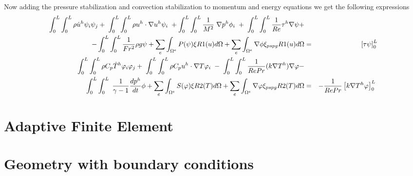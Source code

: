 \bigskip
\noindent Now adding the pressure stabilization and convection stabilization to momentum and energy equations we get the following expressions
\begin{eqnarray*}
\int_{0}^{L} \int_{0}^{L}\rho \dot{u}^h \psi_i \psi_j + \hspace{1mm}\int_{0}^{L} \int_{0}^{L} \rho u^h \cdot \nabla u^h \psi_i \hspace{1mm}  + \int_{0}^{L} \int_{0}^{L}  \frac{1}{M^2}\hspace{1mm}\nabla p^h \phi_i \hspace{1mm} + \hspace{1mm}\int_{0}^{L} \int_{0}^{L}\frac{1}{Re} \tau^h \nabla \psi +  \\ - \int_{0}^{L} \int_{0}^{L}\frac{1}{Fr^2}\rho g \psi + \sum_e \int_{\Omega^e} P(\psi) \xi R1(u)  d\Omega + \sum_e \int_{\Omega^e} \nabla \phi \xi_{pspg} R1(u)  d\Omega  &=& \left[\tau \psi \right]_0^L \\
\int_{0}^{L} \int_{0}^{L} \rho C_p \dot{T}^h \varphi_i \varphi_j + \hspace{1mm}\int_{0}^{L} \int_{0}^{L} \rho C_p u^h \cdot \nabla T \varphi_i \hspace{1mm} - \hspace{1mm} \int_{0}^{L} \int_{0}^{L} \frac{1}{Re Pr}(k \nabla T^h) \nabla \varphi - \\ \int_{0}^{L} \int_{0}^{L} \hspace{1mm} \frac{1}{\gamma -1} \frac{d p^h}{d t} \phi +  \sum_e \int_{\Omega^e} S(\varphi) \xi R2(T)  d\Omega + \sum_e \int_{\Omega^e} \nabla \varphi \xi_{pspg} R2(T)  d\Omega &=& -  \frac{1}{Re Pr} \left[k \nabla T^h \varphi \right]_0^L \hspace{1mm}\\
\end{eqnarray*}


\section{Adaptive Finite Element}


\section{Geometry with boundary conditions}

